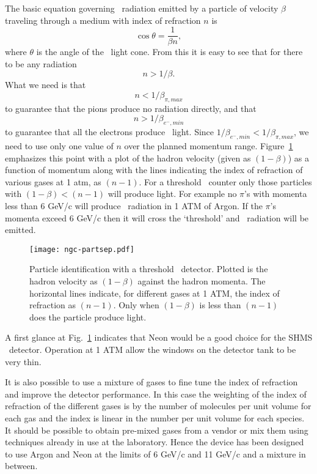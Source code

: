 {The basic equation  governing \Cerenkov\ radiation emitted by a particle
of velocity $\beta$ traveling through a medium with index of refraction
$n$ is \begin{equation}\cos \theta = \frac{1}{\beta n},\end{equation}
where $\theta$ is the angle of the \Cerenkov\ light cone.
From this it is easy to see that for there to be any radiation
$$n > 1/\beta.$$ What we need is that
\begin{equation} n < 1/\beta_{\pi,max}\label{eq:index} \end{equation}
to guarantee that the pions produce no radiation directly, and that
\begin{equation} n > 1/\beta_{e^-,min} \end{equation}
to guarantee that all the electrons produce \Cerenkov\ light. Since
$1/\beta_{e^-,min} < 1/\beta_{\pi,max}$, we need to use only one value
of $n$ over the planned momentum range. Figure~\ref{fig:partsep}
emphasizes this point with a plot of the hadron velocity (given as
$(1-\beta)$) as a function of momentum along with the lines indicating
the index of refraction of various gases at 1 atm, as $(n-1)$.  For a
threshold \Cerenkov\ counter only those particles with $(1-\beta) <
(n-1)$ will produce light. For example no $\pi$'s with momenta less
than 6 GeV/c will produce \Cerenkov\ radiation in 1 ATM of Argon. If the
$\pi$'s momenta exceed 6 GeV/c then it will cross the `threshold' and
\Cerenkov\ radiation will be emitted.
 \begin{figure}[!h] %
   \centering
   \texttt{[image: ngc-partsep.pdf]}
   \caption{Particle identification with a threshold \Cerenkov\
     detector. Plotted is the hadron velocity as $(1-\beta)$ against
     the hadron momenta. The horizontal lines indicate, for different
     gases at 1 ATM, the index of refraction as $(n-1)$. Only when
     $(1-\beta)$ is less than $(n-1)$ does the particle produce
     light.}
   \label{fig:partsep}
\end{figure}
A first glance at Fig.~\ref{fig:partsep} indicates that Neon would be
a good choice for the SHMS \Cerenkov\ detector. Operation at 1 ATM allow
the windows on the detector tank to be very thin.

It is also possible to use a mixture of gases to fine tune the index
of refraction and improve the detector performance. In this case the
weighting of the index of refraction of the different gases is by the
number of molecules per unit volume for each gas and the index is
linear in the number per unit volume for each species. It should be
possible to obtain pre-mixed gases from a vendor or mix them using
techniques already in use at the laboratory. Hence the device has been
designed to use Argon and Neon at the limits of 6 GeV/c and 11 GeV/c
and a mixture in between.


}
